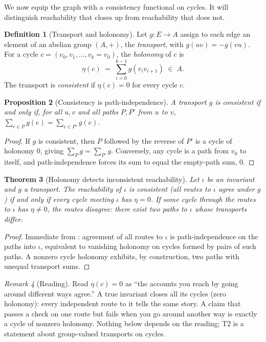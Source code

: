 \documentclass[11pt,a4paper]{article}
\theoremstyle{thmstyle}
\newtheorem{theorem}{Theorem}[section]
\newtheorem{proposition}[theorem]{Proposition}
\theoremstyle{definition}
\newtheorem{definition}[theorem]{Definition}
\theoremstyle{remark}
\newtheorem{remark}[theorem]{Remark}
\newcommand{\E}{E}
\newcommand{\Inv}{\iota}            %
\newcommand{\hol}{\eta}            %
\begin{document}
We now equip the graph with a consistency functional on cycles. It will
distinguish reachability that closes up from reachability that does not.

\begin{definition}[Transport and holonomy]
\label{def:holonomy}
Let $g:\E\to A$ assign to each edge an element of an abelian group $(A,+)$,
the \emph{transport}, with $g(uv)=-g(vu)$. For a cycle
$c=(v_0,v_1,\dots,v_k=v_0)$, the \emph{holonomy} of $c$ is
\[
  \hol(c)\;=\;\sum_{i=0}^{k-1} g(v_iv_{i+1})\;\in\;A.
\]
The transport is \emph{consistent} if $\hol(c)=0$ for every cycle $c$.
\end{definition}

\begin{proposition}[Consistency is path-independence]
\label{prop:pathindep}
A transport $g$ is consistent if and only if, for all $u,v$ and all paths
$P,P'$ from $u$ to $v$, $\sum_{e\in P}g(e)=\sum_{e\in P'}g(e)$.
\end{proposition}

\begin{proof}
If $g$ is consistent, then $P$ followed by the reverse of $P'$ is a cycle of
holonomy $0$, giving $\sum_P g=\sum_{P'} g$. Conversely, any cycle is a path
from $v_0$ to itself, and path-independence forces its sum to equal the
empty-path sum, $0$.
\end{proof}

\begin{theorem}[Holonomy detects inconsistent reachability]
\label{thm:holonomy}
Let $\Inv$ be an invariant and $g$ a transport. The reachability of $\Inv$
is \emph{consistent} (all routes to $\Inv$ agree under $g$) if and only if
every cycle meeting $\Inv$ has $\hol=0$. If some cycle through the routes to
$\Inv$ has $\hol\neq0$, the routes disagree: there exist two paths to $\Inv$
whose transports differ.
\end{theorem}

\begin{proof}
Immediate from : agreement of all routes to $\Inv$ is
path-independence on the paths into $\Inv$, equivalent to vanishing holonomy
on cycles formed by pairs of such paths. A nonzero cycle holonomy exhibits,
by construction, two paths with unequal transport sums.
\end{proof}

\begin{remark}[Reading]
\label{rem:holonomy-read}
Read $\hol(c)=0$ as ``the accounts you reach by going around different ways
agree.'' A true invariant closes all its cycles (zero holonomy): every
independent route to it tells the same story. A claim that passes a check
on one route but fails when you go around another way is exactly a cycle of
nonzero holonomy. Nothing below depends on the reading; T2 is a statement
about group-valued transports on cycles.
\end{remark}
\end{document}
